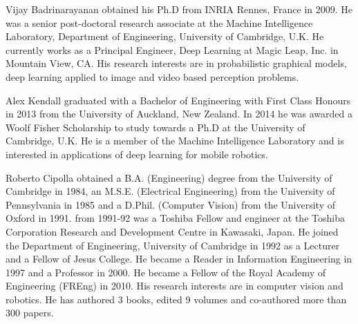 \documentclass[10pt,journal,compsoc]{IEEEtran}
\begin{document}
\ifCLASSOPTIONcaptionsoff
  \newpage
\fi







\begin{IEEEbiography}{Vijay Badrinarayanan} obtained his Ph.D from INRIA Rennes, France in 2009. He was a senior post-doctoral research associate at the Machine Intelligence Laboratory, Department of Engineering, University of Cambridge, U.K. He currently works as a Principal Engineer, Deep Learning at Magic Leap, Inc. in Mountain View, CA. His research interests are in probabilistic graphical models, deep learning applied to image and video based perception problems.
\end{IEEEbiography}

\vspace{-1cm}

\begin{IEEEbiography}{Alex Kendall} graduated with a Bachelor of Engineering with First Class Honours in 2013 from the University of Auckland, New Zealand. In 2014 he was awarded a Woolf Fisher Scholarship to study towards a Ph.D at the University of Cambridge, U.K. He is a member of the Machine Intelligence Laboratory and is interested in applications of deep learning for mobile robotics.
\end{IEEEbiography}

\vspace{-1cm}

\begin{IEEEbiography}{Roberto Cipolla} obtained a B.A. (Engineering) degree from the University of Cambridge in 1984, an M.S.E. (Electrical Engineering) from the University of Pennsylvania in 1985 and a D.Phil. (Computer Vision) from the University of Oxford in 1991. from 1991-92 was a Toshiba Fellow and engineer at the Toshiba Corporation Research and Development Centre in Kawasaki, Japan. He joined the Department of Engineering, University of Cambridge in 1992 as a Lecturer and a Fellow of Jesus College. He became a Reader in Information Engineering in 1997 and a Professor in 2000. He became a Fellow of the Royal Academy of Engineering (FREng) in 2010. His research interests are in computer vision and robotics. He has authored 3 books, edited 9 volumes and co-authored more than 300 papers.
\end{IEEEbiography} 
\end{document}
